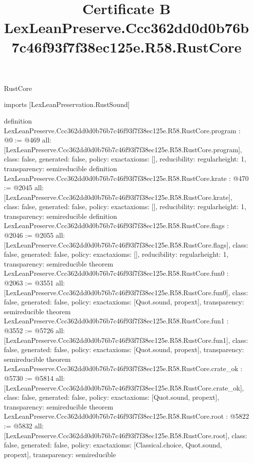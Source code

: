 \begin{lexlean}{RustCore}
\title{Certificate B LexLeanPreserve.Ccc362dd0d0b76b7c46f93f7f38ec125e.R58.RustCore}
\begin{coremodule}
imports [LexLeanPreservation.RustSound]

definition LexLeanPreserve.Ccc362dd0d0b76b7c46f93f7f38ec125e.R58.RustCore.program : @0 := @469 {
  all: [LexLeanPreserve.Ccc362dd0d0b76b7c46f93f7f38ec125e.R58.RustCore.program],
  class: false,
  generated: false,
  policy: exact{axioms: []},
  reducibility: regular{height: 1},
  transparency: semireducible
}
definition LexLeanPreserve.Ccc362dd0d0b76b7c46f93f7f38ec125e.R58.RustCore.krate : @470 := @2045 {
  all: [LexLeanPreserve.Ccc362dd0d0b76b7c46f93f7f38ec125e.R58.RustCore.krate],
  class: false,
  generated: false,
  policy: exact{axioms: []},
  reducibility: regular{height: 1},
  transparency: semireducible
}
definition LexLeanPreserve.Ccc362dd0d0b76b7c46f93f7f38ec125e.R58.RustCore.flags : @2046 := @2055 {
  all: [LexLeanPreserve.Ccc362dd0d0b76b7c46f93f7f38ec125e.R58.RustCore.flags],
  class: false,
  generated: false,
  policy: exact{axioms: []},
  reducibility: regular{height: 1},
  transparency: semireducible
}
theorem LexLeanPreserve.Ccc362dd0d0b76b7c46f93f7f38ec125e.R58.RustCore.fun0 : @2063 := @3551 {
  all: [LexLeanPreserve.Ccc362dd0d0b76b7c46f93f7f38ec125e.R58.RustCore.fun0],
  class: false,
  generated: false,
  policy: exact{axioms: [Quot.sound, propext]},
  transparency: semireducible
}
theorem LexLeanPreserve.Ccc362dd0d0b76b7c46f93f7f38ec125e.R58.RustCore.fun1 : @3552 := @5726 {
  all: [LexLeanPreserve.Ccc362dd0d0b76b7c46f93f7f38ec125e.R58.RustCore.fun1],
  class: false,
  generated: false,
  policy: exact{axioms: [Quot.sound, propext]},
  transparency: semireducible
}
theorem LexLeanPreserve.Ccc362dd0d0b76b7c46f93f7f38ec125e.R58.RustCore.crate_ok : @5730 := @5814 {
  all: [LexLeanPreserve.Ccc362dd0d0b76b7c46f93f7f38ec125e.R58.RustCore.crate_ok],
  class: false,
  generated: false,
  policy: exact{axioms: [Quot.sound, propext]},
  transparency: semireducible
}
theorem LexLeanPreserve.Ccc362dd0d0b76b7c46f93f7f38ec125e.R58.RustCore.root : @5822 := @5832 {
  all: [LexLeanPreserve.Ccc362dd0d0b76b7c46f93f7f38ec125e.R58.RustCore.root],
  class: false,
  generated: false,
  policy: exact{axioms: [Classical.choice, Quot.sound, propext]},
  transparency: semireducible
}


\end{coremodule}
\end{lexlean}
